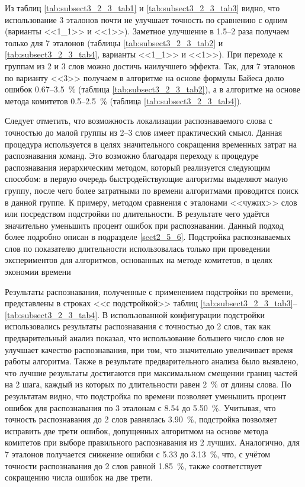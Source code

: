 Из таблиц \ref{tab:subsect3_2_3_tab1} и \ref{tab:subsect3_2_3_tab3} видно, что использование 3 эталонов почти не улучшает точность по сравнению с одним (варианты <<1\_1>> и <<1>>).
Заметное улучшение в 1.5--2 раза получаем только для 7 эталонов (таблицы \ref{tab:subsect3_2_3_tab2} и \ref{tab:subsect3_2_3_tab4}, варианты <<1\_1>> и <<1>>).
При переходе к группам из 2 и 3 слов можно достичь наилучшего эффекта.
Так, для 7 эталонов по варианту <<3>> получаем в алгоритме на основе формулы Байеса долю ошибок 0.67--3.5~\% (таблица \ref{tab:subsect3_2_3_tab2}), а в алгоритме на основе метода комитетов 0.5--2.5~\% (таблица \ref{tab:subsect3_2_3_tab4}).

Следует отметить, что возможность локализации распознаваемого слова с точностью до малой группы из 2--3 слов имеет практический смысл.
Данная процедура используется в целях значительного сокращения временных затрат на распознавания команд.
Это возможно благодаря переходу к процедуре распознавания иерархическим методом, который реализуется следующим способом: в первую очередь быстродействующие алгоритмы выделяют малую группу, после чего более затратными по времени алгоритмами проводится поиск в данной группе.
К примеру, методом сравнения с эталонами <<чужих>> слов \cite{korsun2017recognition} или посредством подстройки по длительности.
В результате чего удаётся значительно уменьшить процент ошибок при распознавании.
Данный подход более подробно описан в подразделе \ref{sect2_5_6}.
Подстройка распознаваемых слов по показателю длительности использовалась только при проведении экспериментов для алгоритмов, основанных на методе комитетов, в целях экономии времени \cite{rabiner1993fundamentals, korsun2017recognition, korsun2016automatic}

Результаты распознавания, полученные с применением подстройки по времени, представлены в строках <<с подстройкой>> таблиц \ref{tab:subsect3_2_3_tab3}--\ref{tab:subsect3_2_3_tab4}.
В использованной конфигурации подстройки использовались результаты распознавания с точностью до 2 слов, так как предварительный анализ показал, что использование большего число слов не улучшает качество распознавания, при том, что значительно увеличивает время работы алгоритма.
Также в результате предварительного анализа было выявлено, что лучшие результаты достигаются при максимальном смещении границ частей на 2 шага, каждый из которых по длительности равен 2~\% от длины слова.
По результатам видно, что подстройка по времени позволяет уменьшить процент ошибок для распознавания по 3 эталонам с 8.54 до 5.50~\%.
Учитывая, что точность распознавания до 2 слов равнялась 3.90~\%, подстройка позволяет исправить две трети ошибок, допущенных алгоритмом на основе метода комитетов при выборе правильного распознавания из 2 лучших.
Аналогично, для 7 эталонов получается снижение ошибки с 5.33 до 3.13~\%, что, с учётом точности распознавания до 2 слов равной 1.85~\%, также соответствует сокращению числа ошибок на две трети.

